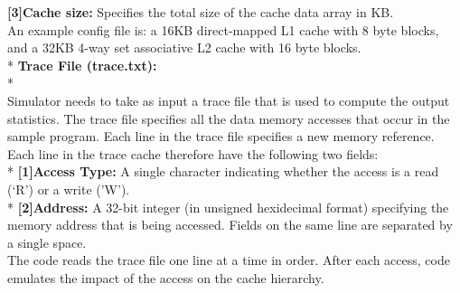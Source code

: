 \documentclass{article}
\begin{document}
\textbf{[3]Cache size:} Specifies the total size of the cache data array in KB.
\bigskip
\\An example config file is: a 16KB direct-mapped L1 cache with 8 byte blocks, and a 32KB 4-way set associative L2 cache with 16 byte blocks.
\bigskip
\\*
\textbf{Trace File (trace.txt):}
\\*
\\ Simulator needs to take as input a trace file that is used to compute the output statistics. The trace file specifies all the data memory accesses that occur in the sample program. Each line in the trace file specifies a new memory reference. Each line in the trace cache therefore have the following two fields:
\bigskip
\\*
\textbf{[1]Access Type:} A single character indicating whether the access is a read (‘R') or a write ('W').
\bigskip
\\*
\textbf{[2]Address:} A 32-bit integer (in unsigned hexidecimal format) specifying the memory address that is being accessed. Fields on the same line are separated by a single space.
\bigskip
\\The code reads the trace file one line at a time in order. After each access, code emulates the impact of the access on the cache hierarchy.
\end{document}
